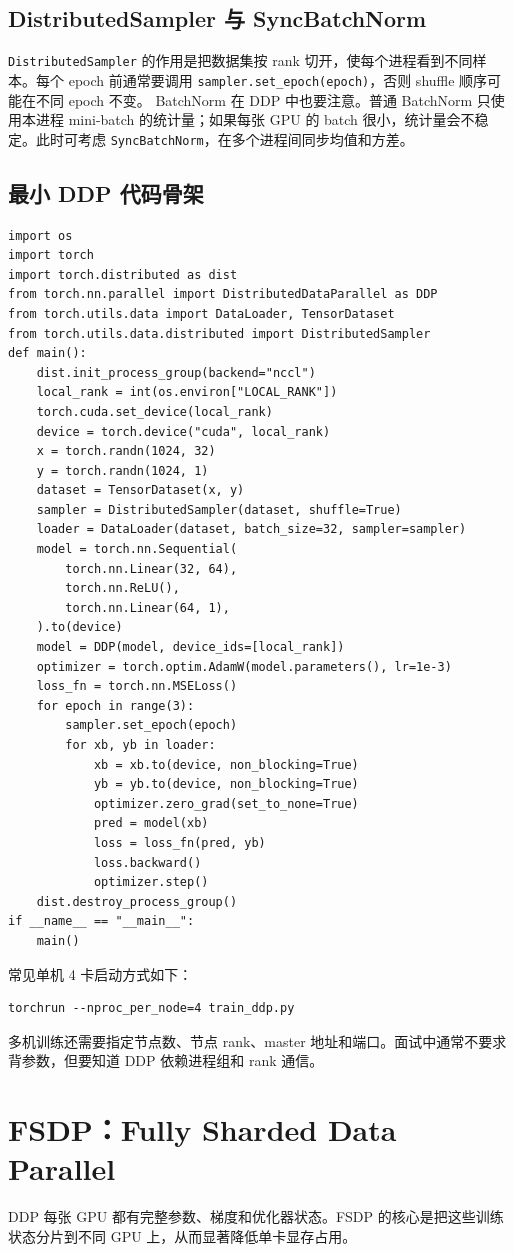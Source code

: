 \subsection{DistributedSampler 与 SyncBatchNorm}
\texttt{DistributedSampler} 的作用是把数据集按 rank 切开，使每个进程看到不同样本。每个 epoch 前通常要调用 \texttt{sampler.set\_epoch(epoch)}，否则 shuffle 顺序可能在不同 epoch 不变。
BatchNorm 在 DDP 中也要注意。普通 BatchNorm 只使用本进程 mini-batch 的统计量；如果每张 GPU 的 batch 很小，统计量会不稳定。此时可考虑 \texttt{SyncBatchNorm}，在多个进程间同步均值和方差。
\subsection{最小 DDP 代码骨架}
\begin{lstlisting}
import os
import torch
import torch.distributed as dist
from torch.nn.parallel import DistributedDataParallel as DDP
from torch.utils.data import DataLoader, TensorDataset
from torch.utils.data.distributed import DistributedSampler
def main():
    dist.init_process_group(backend="nccl")
    local_rank = int(os.environ["LOCAL_RANK"])
    torch.cuda.set_device(local_rank)
    device = torch.device("cuda", local_rank)
    x = torch.randn(1024, 32)
    y = torch.randn(1024, 1)
    dataset = TensorDataset(x, y)
    sampler = DistributedSampler(dataset, shuffle=True)
    loader = DataLoader(dataset, batch_size=32, sampler=sampler)
    model = torch.nn.Sequential(
        torch.nn.Linear(32, 64),
        torch.nn.ReLU(),
        torch.nn.Linear(64, 1),
    ).to(device)
    model = DDP(model, device_ids=[local_rank])
    optimizer = torch.optim.AdamW(model.parameters(), lr=1e-3)
    loss_fn = torch.nn.MSELoss()
    for epoch in range(3):
        sampler.set_epoch(epoch)
        for xb, yb in loader:
            xb = xb.to(device, non_blocking=True)
            yb = yb.to(device, non_blocking=True)
            optimizer.zero_grad(set_to_none=True)
            pred = model(xb)
            loss = loss_fn(pred, yb)
            loss.backward()
            optimizer.step()
    dist.destroy_process_group()
if __name__ == "__main__":
    main()
\end{lstlisting}
常见单机 4 卡启动方式如下：
\begin{lstlisting}[style=plainstyle]
torchrun --nproc_per_node=4 train_ddp.py
\end{lstlisting}
多机训练还需要指定节点数、节点 rank、master 地址和端口。面试中通常不要求背参数，但要知道 DDP 依赖进程组和 rank 通信。
\section{FSDP：Fully Sharded Data Parallel}
DDP 每张 GPU 都有完整参数、梯度和优化器状态。FSDP 的核心是把这些训练状态分片到不同 GPU 上，从而显著降低单卡显存占用。
